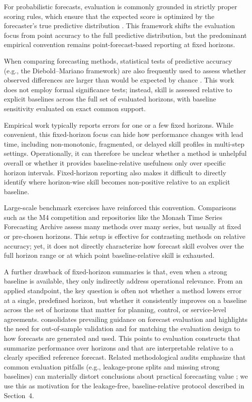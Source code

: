 \documentclass[pdflatex]{sn-jnl}
\begin{document}
For probabilistic forecasts, evaluation is commonly grounded in strictly proper scoring rules,
which ensure that the expected score is optimized by the forecaster's true predictive
distribution \citep{gneiting2007}. This framework shifts the evaluation focus from
point accuracy to the full predictive distribution, but the predominant empirical convention
remains point-forecast-based reporting at fixed horizons.

When comparing forecasting methods, statistical tests of predictive accuracy (e.g., the
Diebold--Mariano framework) are also frequently used to assess whether observed differences
are larger than would be expected by chance \citep{diebold1995}. This work does not
employ formal significance tests; instead, skill is assessed relative to explicit
baselines across the full set of evaluated horizons, with baseline sensitivity
evaluated on exact common support.

Empirical work typically reports errors for one or a few fixed horizons. While convenient, this fixed-horizon focus can hide how performance changes with lead time, including non-monotonic, fragmented, or delayed skill profiles in multi-step settings. Operationally, it can therefore be unclear whether a method is unhelpful overall or whether it provides baseline-relative usefulness only over specific horizon intervals. Fixed-horizon reporting also makes it difficult to directly identify where horizon-wise skill becomes non-positive relative to an explicit baseline.

Large-scale benchmark exercises have reinforced this convention.
Comparisons such as the M4 competition \citep{makridakis2020} and
repositories like the Monash Time Series Forecasting Archive
\citep{godahewa2021} assess many methods over many series, but usually
at fixed or pre-chosen horizons. This setup is effective for contrasting
methods on relative accuracy; yet, it does not directly characterize
how forecast skill evolves over the full horizon range or at which point
baseline-relative skill is exhausted.

A further drawback of fixed-horizon summaries is that, even when a
strong baseline is available, they only indirectly address operational
relevance. From an applied standpoint, the key question is often not
whether a method lowers error at a single, predefined horizon, but
whether it consistently improves on a baseline across the set of
horizons that matter for planning, control, or service-level agreements.
\citet{hyndman2018} consolidates prevailing guidance on forecast
evaluation and highlights the need for out-of-sample validation and for
matching the evaluation design to how forecasts are generated and used.
This points to evaluation constructs that summarize performance over
horizons and that are interpretable relative to a clearly specified
reference forecast.
Related methodological audits emphasize that common evaluation pitfalls (e.g., leakage-prone splits and missing strong baselines) can materially distort conclusions about practical forecasting value \citep{hewamalage2023dmkd}; we use this as motivation for the leakage-free, baseline-relative protocol described in Section~4.
\end{document}
